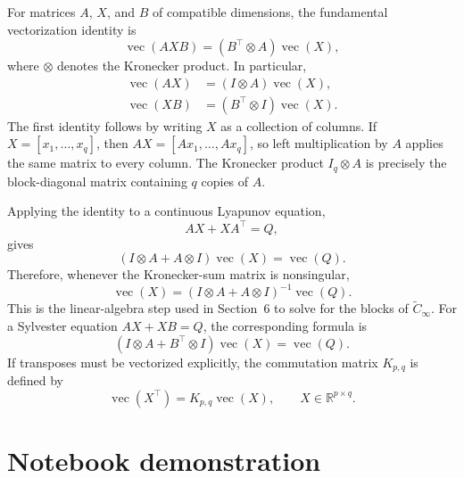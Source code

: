 \documentclass[11pt]{article}
\begin{document}
For matrices $A$, $X$, and $B$ of compatible dimensions, the fundamental
vectorization identity is
\begin{equation}
    \operatorname{vec}(AXB)
    =\left(B^{\top}\otimes A\right)\operatorname{vec}(X),
\end{equation}
where $\otimes$ denotes the Kronecker product. In particular,
\begin{align}
    \operatorname{vec}(AX)
     & =\left(I\otimes A\right)\operatorname{vec}(X),        \\
    \operatorname{vec}(XB)
     & =\left(B^{\top}\otimes I\right)\operatorname{vec}(X).
\end{align}
The first identity follows by writing $X$ as a collection of columns. If
$X=[x_1,\ldots,x_q]$, then $AX=[Ax_1,\ldots,Ax_q]$, so left multiplication
by $A$ applies the same matrix to every column. The Kronecker product
$I_q\otimes A$ is precisely the block-diagonal matrix containing $q$ copies
of $A$.

Applying the identity to a continuous Lyapunov equation,
\begin{equation}
    AX+XA^{\top}=Q,
\end{equation}
gives
\begin{equation}
    \left(I\otimes A+A\otimes I\right)\operatorname{vec}(X)
    =\operatorname{vec}(Q).
\end{equation}
Therefore, whenever the Kronecker-sum matrix is nonsingular,
\begin{equation}
    \operatorname{vec}(X)
    =\left(I\otimes A+A\otimes I\right)^{-1}\operatorname{vec}(Q).
\end{equation}
This is the linear-algebra step used in Section~6 to solve for the blocks of
$\widetilde{C}_\infty$. For a Sylvester equation
$AX+XB=Q$, the corresponding formula is
\begin{equation}
    \left(I\otimes A+B^{\top}\otimes I\right)\operatorname{vec}(X)
    =\operatorname{vec}(Q).
\end{equation}
If transposes must be vectorized explicitly, the commutation matrix
$K_{p,q}$ is defined by
\begin{equation}
    \operatorname{vec}(X^{\top})
    =K_{p,q}\operatorname{vec}(X),
    \qquad X\in\mathbb{R}^{p\times q}.
\end{equation}
\section{Notebook demonstration}
\end{document}
